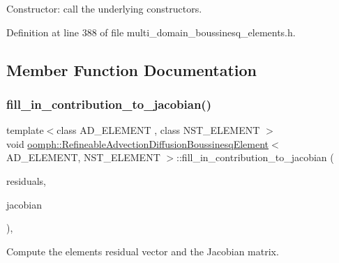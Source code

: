 Constructor\+: call the underlying constructors. 



Definition at line 388 of file multi\+\_\+domain\+\_\+boussinesq\+\_\+elements.\+h.



\subsection{Member Function Documentation}
\mbox{\label{classoomph_1_1RefineableAdvectionDiffusionBoussinesqElement_a89bbdff66fd1fe24f4ae1d681a88d583}} 
\subsubsection{\texorpdfstring{fill\+\_\+in\+\_\+contribution\+\_\+to\+\_\+jacobian()}{fill\_in\_contribution\_to\_jacobian()}}
{\footnotesize\ttfamily template$<$class A\+D\+\_\+\+E\+L\+E\+M\+E\+NT , class N\+S\+T\+\_\+\+E\+L\+E\+M\+E\+NT $>$ \\
void \hyperlink{classoomph_1_1RefineableAdvectionDiffusionBoussinesqElement}{oomph\+::\+Refineable\+Advection\+Diffusion\+Boussinesq\+Element}$<$ A\+D\+\_\+\+E\+L\+E\+M\+E\+NT, N\+S\+T\+\_\+\+E\+L\+E\+M\+E\+NT $>$\+::fill\+\_\+in\+\_\+contribution\+\_\+to\+\_\+jacobian (\begin{DoxyParamCaption}\item[{\hyperlink{classoomph_1_1Vector}{Vector}$<$ double $>$ \&}]{residuals,  }\item[{\hyperlink{classoomph_1_1DenseMatrix}{Dense\+Matrix}$<$ double $>$ \&}]{jacobian }\end{DoxyParamCaption})\hspace{0.3cm}{\ttfamily [inline]}, {\ttfamily [virtual]}}



Compute the element\textquotesingle{}s residual vector and the Jacobian matrix. 



